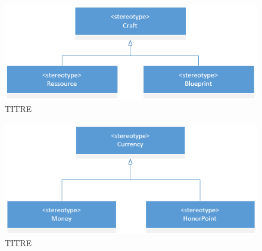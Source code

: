 \begin{figure}[H]
    \centering
    \includegraphics[width=14cm]{10_img/chap5/01_05_craft.PNG} 
    \caption{TITRE}
\end{figure}
\begin{figure}[H]
    \centering
    \includegraphics[width=14cm]{10_img/chap5/01_06_currency.PNG} 
    \caption{TITRE}
\end{figure}


